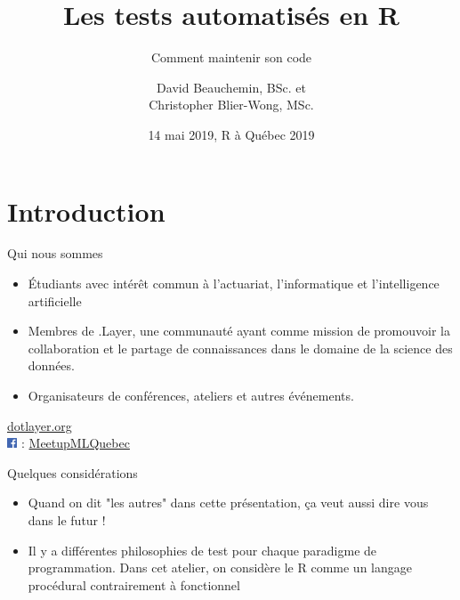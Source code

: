 \documentclass[11pt]{beamer}
\title[Les tests automatisés en R]{Les tests automatisés en R}
\subtitle{Comment maintenir son code}
\author[D. Beauchemin \& C. Blier-Wong]{David Beauchemin, BSc. et \\ Christopher Blier-Wong, MSc.}
\institute[.Layer]
{
	.Layer, Université Laval, CRDM, GRAAL
}
\date{14 mai 2019, R à Québec 2019}
\begin{document}
\begin{frame}[label=titre, plain]
\titlepage
\end{frame}

\section{Introduction}

\begin{frame}{Qui nous sommes}
\begin{itemize}
	\item Étudiants avec intérêt commun à l'actuariat, l'informatique et l'intelligence artificielle
	\item Membres de .Layer, une communauté ayant comme mission de promouvoir la collaboration et le partage de connaissances dans le domaine de la science des données.
	\item Organisateurs de conférences, ateliers et autres événements.
\end{itemize}
\begin{center}
	\href{dotlayer.org}{dotlayer.org}\\
	\includegraphics[height = 0.3cm]{facebook} : \href{https://www.facebook.com/MeetupMLQuebec/}{MeetupMLQuebec}
\end{center}
\end{frame}

\begin{frame}{Quelques considérations}
\begin{itemize}
\item Quand on dit "les autres" dans cette présentation, ça veut aussi dire vous dans le futur !
\item Il y a différentes philosophies de test pour chaque paradigme de programmation. Dans cet atelier, on considère le \textsf{R} comme un langage procédural contrairement à fonctionnel
\end{itemize}
\end{frame}
\end{document}
